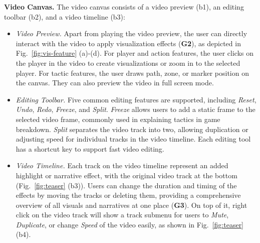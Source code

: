 \vspace{1mm}
\noindent\textbf{Video Canvas.}
The video canvas consists of a video preview (b1), an editing toolbar (b2), and a video timeline (b3):

\begin{itemize}[leftmargin=*]
    \item \emph{Video Preview.} Apart from playing the video preview, the user can directly interact with the video to apply visualization effects (\textbf{G2}), as depicted in Fig.~\ref{fig:vis-feature} (a)-(d). For player and action features, the user clicks on the player in the video to create visualizations or zoom in to the selected player. For tactic features, the user draws path, zone, or marker position on the canvas. They can also preview the video in full screen mode. 

    \item \emph{Editing Toolbar.} Five common editing features are supported, including \textit{Reset}, \textit{Undo}, \textit{Redo}, \textit{Freeze}, and \textit{Split}. \textit{Freeze} allows users to add a static frame to the selected video frame, commonly used in explaining tactics in game breakdown. \textit{Split} separates the video track into two, allowing duplication or adjusting speed for individual tracks in the video timeline. Each editing tool has a shortcut key to support fast video editing. 

    \item \emph{Video Timeline.} Each track on the video timeline represent an added highlight or narrative effect, with the original video track at the bottom (Fig.~\ref{fig:teaser} (b3)). Users can change the duration and timing of the effects by moving the tracks or deleting them, providing a comprehensive overview of all visuals and narratives at one place (\textbf{G3}).
    On top of it, right click on the video track will show a track submenu for users to \textit{Mute}, \textit{Duplicate}, or change \textit{Speed} of the video easily, as shown in Fig.~\ref{fig:teaser} (b4).
\end{itemize}



